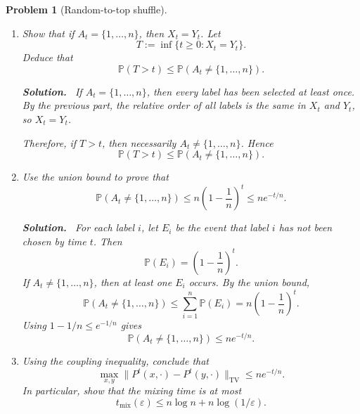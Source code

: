 \documentclass[11pt]{article}
\newtheorem{problem}{Problem}
\newenvironment{solution}{\par\noindent\textbf{Solution.}\ }{\par}
\begin{document}
\begin{problem}[Random-to-top shuffle]
\begin{enumerate}
\begin{solution}
\textit{Case 2:} $i_{t+1} \notin A_t$. Then $A_{t+1} = A_t \cup \{i_{t+1}\}$, and
in both decks the new label $i_{t+1}$ is moved to the top of the deck. In
particular, $i_{t+1}$ is placed above all labels in $A_t$ in both $X_{t+1}$ and
$Y_{t+1}$, while the relative order of the labels already in $A_t$ is unchanged.
Thus the relative order of the labels in $A_{t+1}$ is the same in $X_{t+1}$ and
$Y_{t+1}$.

In either case, the relative order of the labels in $A_{t+1}$ is the same in the
two decks. By induction, the claim holds for all $t$.\qedhere
\end{solution}

\item Show that if $A_t = \{1,\dots,n\}$, then $X_t = Y_t$. Let
\[
  T := \inf\{t \ge 0 : X_t = Y_t\}.
\]
Deduce that
\[
  \mathbb{P}(T>t) \le \mathbb{P}(A_t \neq \{1,\dots,n\}).
\]

\begin{solution}
If $A_t = \{1,\dots,n\}$, then every label has been selected at least once. By
the previous part, the relative order of all labels is the same in $X_t$ and
$Y_t$, so $X_t = Y_t$.

Therefore, if $T>t$, then necessarily $A_t \neq \{1,\dots,n\}$. Hence
\[
  \mathbb{P}(T>t)
  \le \mathbb{P}(A_t \neq \{1,\dots,n\}).
\]
\qedhere
\end{solution}

\item Use the union bound to prove that
\[
  \mathbb{P}(A_t \neq \{1,\dots,n\}) \le n\left(1 - \frac{1}{n}\right)^t
  \le n e^{-t/n}.
\]

\begin{solution}
For each label $i$, let $E_i$ be the event that label $i$ has not been chosen by
time $t$. Then
\[
  \mathbb{P}(E_i) = \left(1 - \frac{1}{n}\right)^t.
\]
If $A_t \neq \{1,\dots,n\}$, then at least one $E_i$ occurs. By the union bound,
\[
  \mathbb{P}(A_t \neq \{1,\dots,n\})
  \le \sum_{i=1}^n \mathbb{P}(E_i)
  = n\left(1 - \frac{1}{n}\right)^t.
\]
Using $1 - 1/n \le e^{-1/n}$ gives
\[
  \mathbb{P}(A_t \neq \{1,\dots,n\}) \le n e^{-t/n}.
\]
\qedhere
\end{solution}

\item Using the coupling inequality, conclude that
\[
  \max_{x,y} \|P^t(x,\cdot) - P^t(y,\cdot)\|_{\mathrm{TV}} \le n e^{-t/n}.
\]
In particular, show that the mixing time is at most
\[
  t_{\mathrm{mix}}(\varepsilon) \le n\log n + n\log(1/\varepsilon).
\]


\end{enumerate}
\end{problem}
\end{document}
